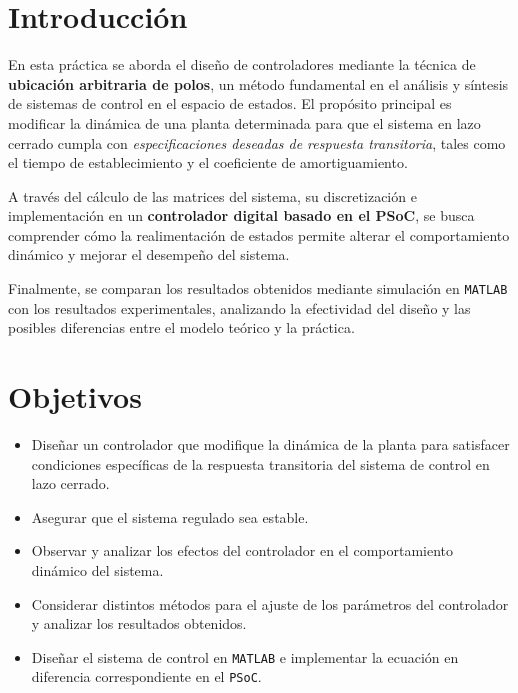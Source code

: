 \section{Introducción}

En esta práctica se aborda el diseño de controladores mediante la técnica de \textbf{ubicación arbitraria de polos}, un método fundamental en el análisis y síntesis de sistemas de control en el espacio de estados. El propósito principal es modificar la dinámica de una planta determinada para que el sistema en lazo cerrado cumpla con \textit{especificaciones deseadas de respuesta transitoria}, tales como el tiempo de establecimiento y el coeficiente de amortiguamiento.

A través del cálculo de las matrices del sistema, su discretización e implementación en un \textbf{controlador digital basado en el PSoC}, se busca comprender cómo la realimentación de estados permite alterar el comportamiento dinámico y mejorar el desempeño del sistema. 

Finalmente, se comparan los resultados obtenidos mediante simulación en \texttt{MATLAB} con los resultados experimentales, analizando la efectividad del diseño y las posibles diferencias entre el modelo teórico y la práctica.

\section*{Objetivos}

\begin{itemize}
	\item Diseñar un controlador que modifique la dinámica de la planta para satisfacer condiciones específicas de la respuesta transitoria del sistema de control en lazo cerrado.
	\item Asegurar que el sistema regulado sea estable.
	\item Observar y analizar los efectos del controlador en el comportamiento dinámico del sistema.
	\item Considerar distintos métodos para el ajuste de los parámetros del controlador y analizar los resultados obtenidos.
	\item Diseñar el sistema de control en \texttt{MATLAB} e implementar la ecuación en diferencia correspondiente en el \texttt{PSoC}.
\end{itemize}



